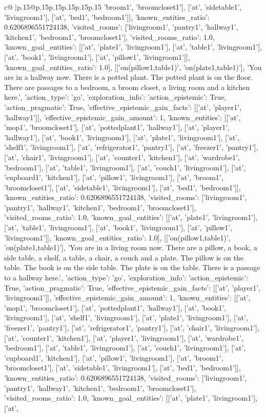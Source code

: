 \documentclass{article}
\begin{document}
{\begin{supertabular}{c@{$\;$}|p{.15\linewidth}@{}p{.15\linewidth}p{.15\linewidth}p{.15\linewidth}p{.15\linewidth}p{.15\linewidth}}
{{{'broom1', 'broomcloset1'], ['at', 'sidetable1', 'livingroom1'], ['at', 'bed1', 'bedroom1']], 'known_entities_ratio': 0.6206896551724138, 'visited_rooms': ['livingroom1', 'pantry1', 'hallway1', 'kitchen1', 'bedroom1', 'broomcloset1'], 'visited_rooms_ratio': 1.0, 'known_goal_entities': [['at', 'plate1', 'livingroom1'], ['at', 'table1', 'livingroom1'], ['at', 'book1', 'livingroom1'], ['at', 'pillow1', 'livingroom1']], 'known_goal_entities_ratio': 1.0}}], [['on(pillow1,table1)', 'on(plate1,table1)'], 'You are in a hallway now. There is a potted plant. The potted plant is on the floor. There are passages to a bedroom, a broom closet, a living room and a kitchen here.', {'action_type': 'go', 'exploration_info': {'action_epistemic': True, 'action_pragmatic': True, 'effective_epistemic_gain_facts': [['at', 'player1', 'hallway1']], 'effective_epistemic_gain_amount': 1, 'known_entities': [['at', 'mop1', 'broomcloset1'], ['at', 'pottedplant1', 'hallway1'], ['at', 'player1', 'hallway1'], ['at', 'book1', 'livingroom1'], ['at', 'plate1', 'livingroom1'], ['at', 'shelf1', 'livingroom1'], ['at', 'refrigerator1', 'pantry1'], ['at', 'freezer1', 'pantry1'], ['at', 'chair1', 'livingroom1'], ['at', 'counter1', 'kitchen1'], ['at', 'wardrobe1', 'bedroom1'], ['at', 'table1', 'livingroom1'], ['at', 'couch1', 'livingroom1'], ['at', 'cupboard1', 'kitchen1'], ['at', 'pillow1', 'livingroom1'], ['at', 'broom1', 'broomcloset1'], ['at', 'sidetable1', 'livingroom1'], ['at', 'bed1', 'bedroom1']], 'known_entities_ratio': 0.6206896551724138, 'visited_rooms': ['livingroom1', 'pantry1', 'hallway1', 'kitchen1', 'bedroom1', 'broomcloset1'], 'visited_rooms_ratio': 1.0, 'known_goal_entities': [['at', 'plate1', 'livingroom1'], ['at', 'table1', 'livingroom1'], ['at', 'book1', 'livingroom1'], ['at', 'pillow1', 'livingroom1']], 'known_goal_entities_ratio': 1.0}}], [['on(pillow1,table1)', 'on(plate1,table1)'], 'You are in a living room now. There are a pillow, a book, a side table, a shelf, a table, a chair, a couch and a plate. The pillow is on the table. The book is on the side table. The plate is on the table. There is a passage to a hallway here.', {'action_type': 'go', 'exploration_info': {'action_epistemic': True, 'action_pragmatic': True, 'effective_epistemic_gain_facts': [['at', 'player1', 'livingroom1']], 'effective_epistemic_gain_amount': 1, 'known_entities': [['at', 'mop1', 'broomcloset1'], ['at', 'pottedplant1', 'hallway1'], ['at', 'book1', 'livingroom1'], ['at', 'shelf1', 'livingroom1'], ['at', 'plate1', 'livingroom1'], ['at', 'freezer1', 'pantry1'], ['at', 'refrigerator1', 'pantry1'], ['at', 'chair1', 'livingroom1'], ['at', 'counter1', 'kitchen1'], ['at', 'player1', 'livingroom1'], ['at', 'wardrobe1', 'bedroom1'], ['at', 'table1', 'livingroom1'], ['at', 'couch1', 'livingroom1'], ['at', 'cupboard1', 'kitchen1'], ['at', 'pillow1', 'livingroom1'], ['at', 'broom1', 'broomcloset1'], ['at', 'sidetable1', 'livingroom1'], ['at', 'bed1', 'bedroom1']], 'known_entities_ratio': 0.6206896551724138, 'visited_rooms': ['livingroom1', 'pantry1', 'hallway1', 'kitchen1', 'bedroom1', 'broomcloset1'], 'visited_rooms_ratio': 1.0, 'known_goal_entities': [['at', 'plate1', 'livingroom1'], ['at', }}}
\end{supertabular}}
\end{document}

